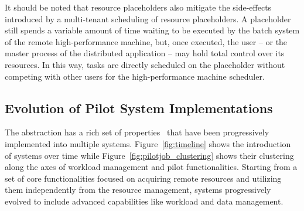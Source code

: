 \documentclass{sig-alternate}
\begin{document}
It should be noted that resource placeholders also mitigate the side-effects
introduced by a multi-tenant scheduling of resource placeholders. A placeholder
still spends a variable amount of time waiting to be executed by the batch
system of the remote high-performance machine, but, once executed, the user --
or the master process of the distributed application -- may hold total control
over its resources. In this way, tasks are directly scheduled on the placeholder
without competing with other users for the high-performance machine scheduler.


\subsection{Evolution of Pilot System Implementations}
\label{sec:histimpl}

The \pilot abstraction has a rich set of properties~\cite{luckow2012towards}
that have been progressively implemented into multiple \pilotjob systems.
Figure~\ref{fig:timeline} shows the introduction of \pilotjob systems over time
while Figure~\ref{fig:pilotjob_clustering} shows their clustering along the axes
of workload management and pilot functionalities. Starting from a set of core
functionalities focused on acquiring remote resources and utilizing them
independently from the resource management, \pilotjob systems progressively
evolved to include advanced capabilities like workload and data management.


\end{document}
